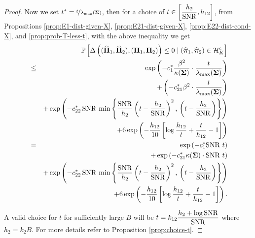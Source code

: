 \documentclass[numsec,webpdf,modern,medium,namedate]{oup-authoring-template}
\theoremstyle{thmstyleone}%
\theoremstyle{thmstyletwo}%
\theoremstyle{thmstylethree}%
\begin{document}
\begin{proof}
    Now we set $t^\ast = \nicefrac{t}{\lambda_{\max}(\boldsymbol{\Sigma})}$, then for a choice of $t \in \left[\dfrac{h_2}{\mathrm{SNR}},h_{12}\right]$, from Propositions \ref{prop:E1-dist-given-X}, \ref{prop:E21-dist-given-X}, \ref{prop:E22-dist-cond-X},  and \ref{prop:prob-T-less-t},  with the above inequality we get
    {\small
    \begin{eqnarray*}
        &&\Prob\left[\Delta \left( (\hatPi_1, \hatPi_2 ), \left( \bPi_1, \bPi_2 \right) \right) \leq 0 \mid (\hatpi_1, \hatpi_2 ) \in \calH_K^c\right]\\
        & \leq & \exp\left(-c_1^\ast\dfrac{\beta^2}{\kappa(\bSig)}\cdot \dfrac{t}{\lambda_{\max}(\bSig)}\right)  \\
        && + \left(-c^\ast_{21}\beta^2\cdot \dfrac{t}{\lambda_{\max}(\bSig)}\right)\\
        && +  \exp \left( - c^\ast_{22} \, \snr \, \min \left\{\frac{\snr}{h_2}\left(t - \dfrac{h_2}{\snr}\right)^2, \, \left(t - \dfrac{h_2}{\snr}\right) \right\}\right)\\
        && + 6 \exp\left(-\frac{h_{12}}{10}\left[\log \frac{h_{12}}{t} + \dfrac{t}{h_{12}} -1\right]\right)\\
        & = & \exp\left(-c^\ast_1\snr \ t\right)\\
        && + \exp\left(-c^\ast_{21} \kappa(\bSig) \cdot \snr \ t\right)\\
        && +  \exp \left( - c^\ast_{22} \, \snr \, \min \left\{\frac{\snr}{h_2}\left(t - \dfrac{h_2}{\snr}\right)^2, \, \left(t - \dfrac{h_2}{\snr}\right) \right\}\right)\\
        && + 6 \exp\left(-\frac{h_{12}}{10}\left[\log \frac{h_{12}}{t} + \dfrac{t}{h_{12}} -1\right]\right).
    \end{eqnarray*}}

A valid choice for $t$ for sufficiently large $B$ will be $t = k_{12}\dfrac{h_2 + \log \mathrm{SNR}}{\mathrm{SNR}}$ where $h_2 = k_2B$. For more details refer to Proposition \ref{prop:choice-t}. 


\end{proof}
\end{document}
